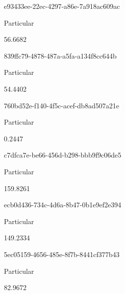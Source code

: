 \documentclass[
  11pt,
  a4paper,
  DIV=11,
  numbers=noendperiod]{scrartcl}
\begin{document}
\n    

\n    

\n      

e93433ee-22ec-4297-a86e-7a918ac609ac

\n      

Particular

\n      

56.6682

\n    

\n    

\n      

839ffc79-4878-487a-a5fa-a134f8cc644b

\n      

Particular

\n      

54.4402

\n    

\n    

\n      

760bd52e-f140-4f5c-acef-db8ad507a21e

\n      

Particular

\n      

0.2447

\n    

\n    

\n      

c7dfca7e-be66-456d-b298-bbb9f9c06de5

\n      

Particular

\n      

159.8261

\n    

\n    

\n      

ecb0d436-734c-4d6a-8b47-0b1e9ef2e394

\n      

Particular

\n      

149.2334

\n    

\n    

\n      

5ec05159-4656-485e-8f7b-8441cf377b43

\n      

Particular

\n      

82.9672

\n    

\n    
\end{document}
